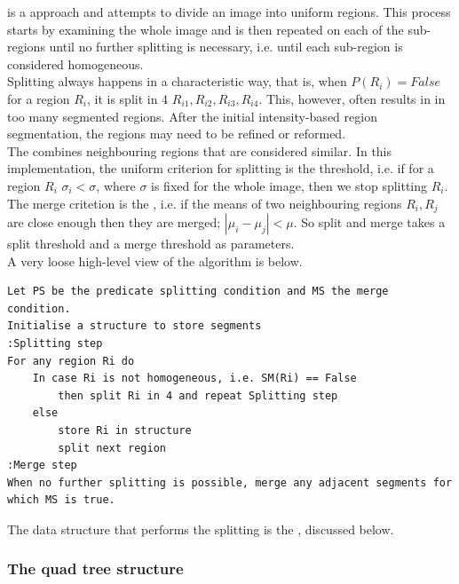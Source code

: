 \documentclass[a4paper]{article}
\begin{document}
 is a  approach and attempts to divide an image into uniform regions. This process starts by examining the whole image and is then repeated on each of the sub-regions until no further splitting is necessary, i.e. until each sub-region is considered homogeneous. \\
Splitting always happens in a characteristic way, that is, when $P(R_i)=False$ for a region $R_i$, it is split in 4  $R_{i1}, R_{i2}, R_{i3}, R_{i4}$. This, however, often results in in too many segmented regions. After the initial intensity-based region segmentation, the regions may need to be refined or reformed. \\
The  combines neighbouring regions that are considered similar. In this implementation, the uniform criterion for splitting is the  threshold, i.e. if for a region $R_i$ $\sigma_{i} < \sigma$, where $\sigma$ is fixed for the whole image, then we stop splitting $R_i$. The merge critetion is the , i.e. if the means of two neighbouring regions $R_i, R_j$ are close enough then they are merged; $\left|\mu_i - \mu_j \right| < \mu$. So split and merge takes a split threshold and a merge threshold as parameters.\\
A very loose high-level view of the algorithm is below.
\begin{verbatim}
Let PS be the predicate splitting condition and MS the merge condition.
Initialise a structure to store segments
:Splitting step
For any region Ri do
    In case Ri is not homogeneous, i.e. SM(Ri) == False
        then split Ri in 4 and repeat Splitting step
    else
        store Ri in structure
        split next region
:Merge step
When no further splitting is possible, merge any adjacent segments for which MS is true.
\end{verbatim}

The data structure that performs the splitting is the , discussed below.




\subsubsection{The quad tree structure}
\end{document}
